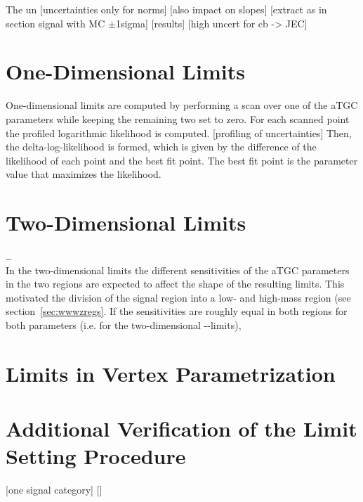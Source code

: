 \noindent The un
[uncertainties only for norms]
[also impact on slopes]
[extract as in section signal with MC $\pm$1sigma]
[results]
[high uncert for cb -> JEC]


\section{One-Dimensional Limits}
One-dimensional limits are computed by performing a scan over one of the aTGC parameters while keeping the remaining two set to zero. For each scanned point the profiled logarithmic likelihood is computed.
[profiling of uncertainties]
Then, the delta-log-likelihood is formed, which is given by the difference of the likelihood of each point and the best fit point. The best fit point is the parameter value that maximizes the likelihood. 


\section{Two-Dimensional Limits}
\label{sec:2dlims}
\dots \\
\noindent In the two-dimensional limits the different sensitivities of the aTGC parameters in the two regions are expected to affect the shape of the resulting limits. This motivated the division of the signal region into a low- and high-mass region (see section~\ref{sec:wwwzregs}. If the sensitivities are roughly equal in both regions for both parameters (i.e. for the two-dimensional \Tcwww -\Tccw -limits), 


\section{Limits in Vertex Parametrization}
\label{sec:vertex}


\section{Additional Verification of the Limit Setting Procedure}
[one signal category]
[]
